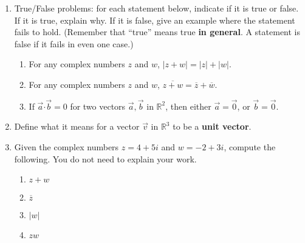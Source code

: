 \documentclass[12pt]{article}
\newcommand{\points}[1]{\marginpar{\hspace{24pt}[#1]}}
\newcommand{\R}{\mathbb{R}}
\newcommand{\dotp}{\boldsymbol{\cdot}}
\newcommand{\abs}[1]{\lvert #1\rvert}
\begin{document}
\begin{enumerate}
 \item True/False problems: for each statement below, indicate if it is true or false. If it is true, explain why. If it is false, give an example where the statement fails to hold. (Remember that ``true'' means true \textbf{in general}. A statement is false if it fails in even one case.) 

 \begin{enumerate}
  \item For any complex numbers $z$ and $w$, $\abs{z+w} = \abs{z}+\abs{w}$. \points{3}

\vspace{1.75in}

 \item For any complex numbers $z$ and $w$, $\overline{z+w} = \overline{z} + \overline{w}$. \points{3}

\vspace{1.75in}

 \item If $\vec{a}\dotp\vec{b}=0$ for two vectors $\vec{a},\vec{b}$ in $\R^2$, then either $\vec{a}=\vec{0}$, or $\vec{b}=\vec{0}$.\points{3}

\vspace{1.75in}

 \end{enumerate}

 \item Define what it means for a vector $\vec{v}$ in $\R^3$ to be a \textbf{unit vector}.\points{3}

\newpage

\item Given the complex numbers $z=4+5i$ and $w=-2+3i$, compute the following. You do not need to explain your work.
 \begin{enumerate}
\item $z+w$ \points{2}

\vspace{1in}

\item $\overline{z}$ \points{2}

\vspace{1in}

\item $\abs{w}$ \points{2}

\vspace{1.25in}

\item $zw$ \points{3}


\end{enumerate}
\end{enumerate}
\end{document}

